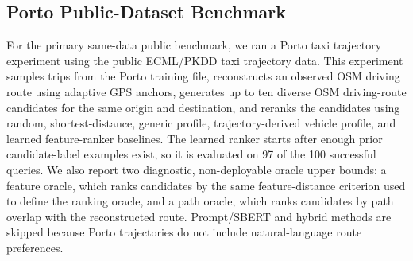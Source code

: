 \subsection{Porto Public-Dataset Benchmark}
For the primary same-data public benchmark, we ran a Porto taxi trajectory experiment using the public ECML/PKDD taxi trajectory data. This experiment samples trips from the Porto training file, reconstructs an observed OSM driving route using adaptive GPS anchors, generates up to ten diverse OSM driving-route candidates for the same origin and destination, and reranks the candidates using random, shortest-distance, generic profile, trajectory-derived vehicle profile, and learned feature-ranker baselines. The learned ranker starts after enough prior candidate-label examples exist, so it is evaluated on 97 of the 100 successful queries. We also report two diagnostic, non-deployable oracle upper bounds: a feature oracle, which ranks candidates by the same feature-distance criterion used to define the ranking oracle, and a path oracle, which ranks candidates by path overlap with the reconstructed route. Prompt/SBERT and hybrid methods are skipped because Porto trajectories do not include natural-language route preferences.


